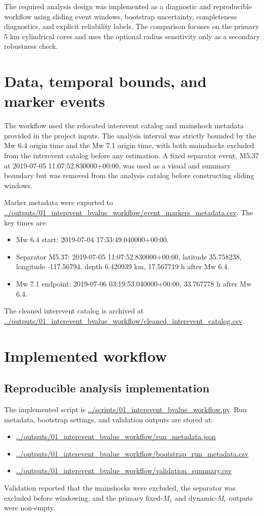 \documentclass[11pt]{article}
\begin{document}
The required analysis design was implemented as a diagnostic and reproducible workflow using sliding event windows, bootstrap uncertainty, completeness diagnostics, and explicit reliability labels. The comparison focuses on the primary 5 km cylindrical cores and uses the optional radius sensitivity only as a secondary robustness check.

\section{Data, temporal bounds, and marker events}
The workflow used the relocated interevent catalog and mainshock metadata provided in the project inputs. The analysis interval was strictly bounded by the Mw 6.4 origin time and the Mw 7.1 origin time, with both mainshocks excluded from the interevent catalog before any estimation. A fixed separator event, M5.37 at 2019-07-05 11:07:52.830000+00:00, was used as a visual and summary boundary but was removed from the analysis catalog before constructing sliding windows.

Marker metadata were exported to \url{../outputs/01_interevent_bvalue_workflow/event_markers_metadata.csv}. The key times are:
\begin{itemize}[leftmargin=1.5em]
    \item Mw 6.4 start: 2019-07-04 17:33:49.040000+00:00.
    \item Separator M5.37: 2019-07-05 11:07:52.830000+00:00, latitude 35.758238, longitude -117.56794, depth 6.420939 km, 17.567719 h after Mw 6.4.
    \item Mw 7.1 endpoint: 2019-07-06 03:19:53.040000+00:00, 33.767778 h after Mw 6.4.
\end{itemize}

The cleaned interevent catalog is archived at \url{../outputs/01_interevent_bvalue_workflow/cleaned_interevent_catalog.csv}.

\section{Implemented workflow}
\subsection{Reproducible analysis implementation}
The implemented script is
\url{../scripts/01_interevent_bvalue_workflow.py}.
Run metadata, bootstrap settings, and validation outputs are stored at:
\begin{itemize}[leftmargin=1.5em]
    \item \url{../outputs/01_interevent_bvalue_workflow/run_metadata.json}
    \item \url{../outputs/01_interevent_bvalue_workflow/bootstrap_run_metadata.csv}
    \item \url{../outputs/01_interevent_bvalue_workflow/validation_summary.csv}
\end{itemize}
Validation reported that the mainshocks were excluded, the separator was excluded before windowing, and the primary fixed-$M_c$ and dynamic-$M_c$ outputs were non-empty.
\end{document}
